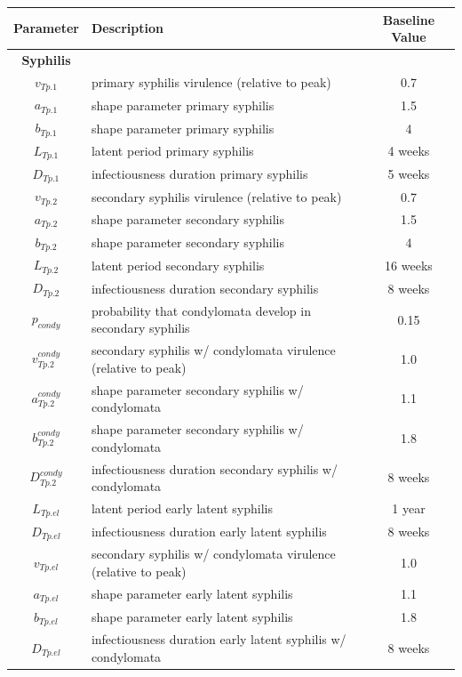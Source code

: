 \documentclass[11pt, onecolumn]{article}
\begin{document}

\renewcommand{\arraystretch}{1.25}
\begin{table}[htdp]

\begin{scriptsize} %

\begin{center}
\begin{tabular}{|clc|}
\hline
\textbf{Parameter}  & \textbf{Description} & \textbf{Baseline Value}\\
\hline
\hline
\textbf{Syphilis} & & \\
\hline
$v_{Tp.1}$ & primary syphilis virulence (relative to peak) & 0.7\\
$a_{Tp.1}$ &  shape parameter primary syphilis & 1.5\\
$b_{Tp.1}$ &  shape parameter primary syphilis & 4\\ 
$L_{Tp.1}$ &  latent period primary syphilis & 4 weeks\\
$D_{Tp.1}$ &  infectiousness duration primary syphilis & 5 weeks\\
$v_{Tp.2}$ & secondary syphilis virulence (relative to peak) & 0.7\\
$a_{Tp.2}$ &  shape parameter secondary syphilis & 1.5\\
$b_{Tp.2}$ &  shape parameter secondary syphilis & 4\\ 
$L_{Tp.2}$ &  latent period secondary syphilis & 16 weeks\\
$D_{Tp.2}$ &  infectiousness duration secondary syphilis & 8 weeks\\
$p_{condy}$& probability that condylomata develop in secondary syphilis & 0.15 \\
$v_{Tp.2}^{condy}$ & secondary syphilis w/ condylomata virulence (relative to peak) & 1.0\\
$a_{Tp.2}^{condy}$ &  shape parameter secondary syphilis w/ condylomata & 1.1\\
$b_{Tp.2}^{condy}$ &  shape parameter secondary syphilis w/ condylomata & 1.8\\ 
$D_{Tp.2}^{condy}$ &  infectiousness duration secondary syphilis w/ condylomata & 8 weeks\\

$L_{Tp.el}$ &  latent period early latent syphilis &1 year\\
$D_{Tp.el}$ &  infectiousness duration early latent syphilis & 8 weeks\\
$v_{Tp.el}$ & secondary syphilis w/ condylomata virulence (relative to peak) & 1.0\\
$a_{Tp.el}$ &  shape parameter early latent syphilis  & 1.1\\
$b_{Tp.el}$ &  shape parameter early latent syphilis & 1.8\\ 
$D_{Tp.el}$ &  infectiousness duration early latent syphilis w/ condylomata & 8 weeks\\


\end{tabular}
\end{center}
\end{scriptsize}
\end{table}
\end{document}
